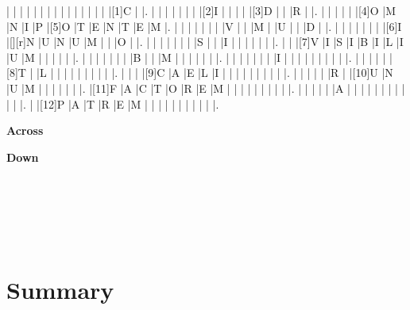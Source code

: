 \documentclass[12pt,a4paper]{article}
\begin{document}
\begin{Puzzle}{17}{15}
|{} |{} |{} |{} |{} |{} |{} |{} |{} |{} |{} |{} |{} |{} |{} |[1]C |{} |.
|{} |{} |{} |{} |{} |{} |{} |[2]I |{} |{} |{} |{} |[3]D |{} |{} |R |{} |.
|{} |{} |{} |{} |{} |[4]O |M |N |I |P |[5]O |T |E |N |T |E |M |.
|{} |{} |{} |{} |{} |{} |{} |V |{} |{} |M |{} |U |{} |{} |D |{} |.
|{} |{} |{} |{} |{} |{} |{} |[6]I |[][r]N |U |N |U |M |{} |{} |O |{} |.
|{} |{} |{} |{} |{} |{} |{} |S |{} |{} |I |{} |{} |{} |{} |{} |{} |.
|{} |{} |[7]V |I |S |I |B |I |L |I |U |M |{} |{} |{} |{} |{} |.
|{} |{} |{} |{} |{} |{} |{} |B |{} |{} |M |{} |{} |{} |{} |{} |{} |.
|{} |{} |{} |{} |{} |{} |{} |I |{} |{} |{} |{} |{} |{} |{} |{} |{} |.
|{} |{} |{} |{} |{} |[8]T |{} |L |{} |{} |{} |{} |{} |{} |{} |{} |{} |.
|{} |{} |{} |[9]C |A |E |L |I |{} |{} |{} |{} |{} |{} |{} |{} |{} |.
|{} |{} |{} |{} |{} |R |{} |[10]U |N |U |M |{} |{} |{} |{} |{} |{} |.
|[11]F |A |C |T |O |R |E |M |{} |{} |{} |{} |{} |{} |{} |{} |{} |.
|{} |{} |{} |{} |{} |A |{} |{} |{} |{} |{} |{} |{} |{} |{} |{} |{} |.
|{} |[12]P |A |T |R |E |M |{} |{} |{} |{} |{} |{} |{} |{} |{} |{} |.
\end{Puzzle}

\begin{PuzzleClues}{\textbf{Across}}







\end{PuzzleClues}%
\begin{PuzzleClues}{\textbf{Down}}\\
 \\
 \\
 \\
 \\
 \\
\end{PuzzleClues}

\newpage

\section{Summary}
\end{document}
